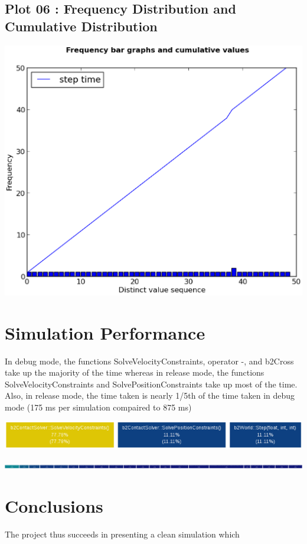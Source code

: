 \documentclass[11pt]{article}
\begin{document}
\subsection{Plot 06 : Frequency Distribution and Cumulative Distribution}
\begin{center}
\includegraphics[scale=0.5]{plot06}
\end{center}
\section{Simulation Performance}
In debug mode, the functions SolveVelocityConstraints, operator -, and b2Cross take up the majority of the time whereas in release mode, the functions SolveVelocityConstraints and SolvePositionConstraints take up most of the time. Also, in release mode, the time taken is nearly 1/5th of the time taken in debug mode (175 ms per simulation compaired to 875 ms)
\begin{center}
\includegraphics[scale=0.5]{release}
\end{center}
\begin{center}
\includegraphics[scale=0.05]{debug}
\end{center}
\section{Conclusions}
The project thus succeeds in presenting a clean simulation which 


\end{document}
